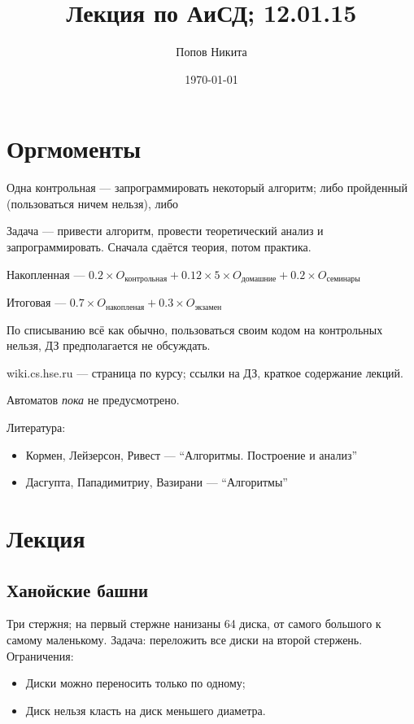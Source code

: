 \documentclass[11pt,a4paper]{article}
\title{Лекция по АиСД; 12.01.15}
\date{\today}
\author{Попов Никита}
\begin{document}
\maketitle

\section*{Оргмоменты}
Одна контрольная --- запрограммировать некоторый алгоритм; либо пройденный (пользоваться ничем нельзя), либо

Задача --- привести алгоритм, провести теоретический анализ и запрограммировать. Сначала сдаётся теория, потом практика.

Накопленная --- $0.2\times O_{\text{контрольная}}+0.12\times5\times O_{\text{домашние}}+0.2\times O_{\text{семинары}}$

Итоговая --- $0.7\times O_{\text{накопленая}}+0.3\times O_{\text{экзамен}}$

По списыванию всё как обычно, пользоваться своим кодом на контрольных нельзя, ДЗ предполагается не обсуждать.

wiki.cs.hse.ru --- страница по курсу; ссылки на ДЗ, краткое содержание лекций.

Автоматов \emph{пока} не предусмотрено.

Литература:

\begin{itemize}
    \item Кормен, Лейзерсон, Ривест --- ``Алгоритмы. Построение и анализ''
    \item Дасгупта, Пападимитриу, Вазирани --- ``Алгоритмы''
\end{itemize}

\section*{Лекция}

\subsection*{Ханойские башни}
Три стержня; на первый стержне нанизаны 64 диска, от самого большого к самому маленькому. Задача: переложить все диски на второй стержень. Ограничения:
\begin{itemize}
    \item Диски можно переносить только по одному;
    \item Диск нельзя класть на диск меньшего диаметра.
\end{itemize}
\end{document}
